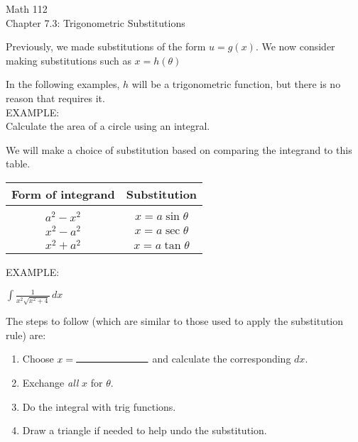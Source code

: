 \documentclass[11pt]{article}
\def\FillInBlank{\rule{1in}{.01in} }
\begin{document}
\begin{center}
\Large
\rm{Math 112}
\\
\rm{Chapter 7.3:  Trigonometric Substitutions}
\\
\end{center}
\vspace{0.2in}

Previously, we made substitutions of the form $u=g(x)$.  We now consider making substitutions such as $x=h(\theta)$\\

\vspace{2in}

In the following examples, $h$ will be a trigonometric function, but there is no reason that requires it.\\

EXAMPLE:\\

Calculate the area of a circle using an integral.

\pagebreak

We will make a choice of substitution based on comparing the integrand to this table.\\

\vspace{0.2in}

\begin{tabular}{|c|c|}\hline
Form of integrand & Substitution \\
\hline
& \\
$a^2-x^2$ & $x = a\sin{\theta}$ \\
$x^2-a^2$ & $x = a\sec{\theta}$ \\
$x^2+a^2$ & $x = a\tan{\theta}$ \\
\hline
\end{tabular}
\vspace{0.5in}


EXAMPLE:\\

\vspace{0.2in}


$\int \frac{1}{x^2\sqrt{x^2+4}}\, dx$

\pagebreak

The steps to follow (which are similar to those used to apply the substitution rule) are:

\begin{enumerate}
	\item {Choose $x= \FillInBlank$ and calculate the corresponding $dx$.}
	\item{Exchange \emph{all} $x$ for $\theta$.}
	\item{Do the integral with trig functions.}
	\item{Draw a triangle if needed to help undo the substitution.}
\end{enumerate}
\end{document}
